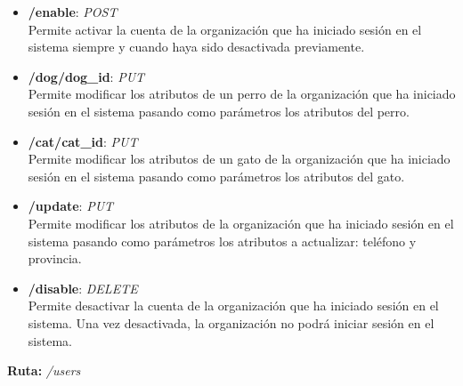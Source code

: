 \begin{itemize}
    \item \textbf{/enable}: \textit{POST} \\
    Permite activar la cuenta de la organización que ha iniciado sesión en el sistema siempre y cuando haya sido desactivada previamente.
    \item \textbf{/dog/{dog\_id}}: \textit{PUT} \\
    Permite modificar los atributos de un perro de la organización que ha iniciado sesión en el sistema pasando como parámetros los atributos del perro.
    \item \textbf{/cat/{cat\_id}}: \textit{PUT} \\
    Permite modificar los atributos de un gato de la organización que ha iniciado sesión en el sistema pasando como parámetros los atributos del gato.
    \item \textbf{/update}: \textit{PUT} \\
    Permite modificar los atributos de la organización que ha iniciado sesión en el sistema pasando como parámetros los atributos a actualizar: teléfono y provincia.
    \item \textbf{/disable}: \textit{DELETE} \\
    Permite desactivar la cuenta de la organización que ha iniciado sesión en el sistema. Una vez desactivada, la organización no podrá iniciar sesión en el sistema.
\end{itemize}

\textbf{Ruta:} \textit{/users}

